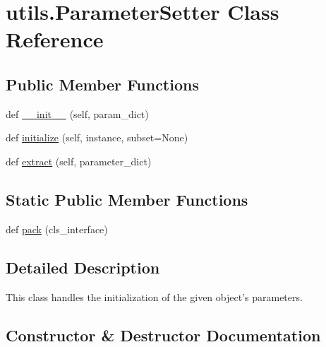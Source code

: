 \hypertarget{classutils_1_1ParameterSetter}{}\section{utils.\+Parameter\+Setter Class Reference}
\label{classutils_1_1ParameterSetter}
\subsection*{Public Member Functions}
\begin{DoxyCompactItemize}
\item 
def \hyperlink{classutils_1_1ParameterSetter_a8ebe2dd6a82c2ab84b521bb2aebb407f}{\+\_\+\+\_\+init\+\_\+\+\_\+} (self, param\+\_\+dict)
\item 
def \hyperlink{classutils_1_1ParameterSetter_ada083dc5eae2953857625164785165b2}{initialize} (self, instance, subset=None)
\item 
def \hyperlink{classutils_1_1ParameterSetter_ad2489644e7d11804e4b937ead2f14a3d}{extract} (self, parameter\+\_\+dict)
\end{DoxyCompactItemize}
\subsection*{Static Public Member Functions}
\begin{DoxyCompactItemize}
\item 
def \hyperlink{classutils_1_1ParameterSetter_a193bab0df6dea312b22baafc2f57c31d}{pack} (cls\+\_\+interface)
\end{DoxyCompactItemize}


\subsection{Detailed Description}
\begin{DoxyVerb}This class handles the initialization of the given object's parameters.
\end{DoxyVerb}
 

\subsection{Constructor \& Destructor Documentation}

